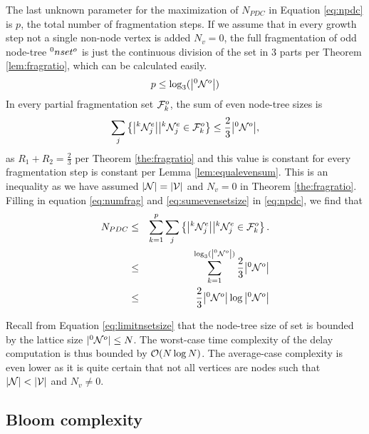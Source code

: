 

The last unknown parameter for the maximization of $N_{PDC}$ in Equation \eqref{eq:npdc} is $p$, the total number of fragmentation steps. If we assume that in every growth step not a single non-node vertex is added $N_v = 0$, the full fragmentation of odd node-tree ${}^{0}nset^o$ is just the continuous division of the set in 3 parts per Theorem \ref{lem:fragratio}, which can be calculated easily.
\begin{equation}\label{eq:numfrag}
  p \leq \log_3(\abs{{}^{0}\mathcal{N}^o})
\end{equation}
In every partial fragmentation set $\mathcal{F}^o_k$, the sum of even node-tree sizes is 
\begin{equation}\label{eq:sumevensetsize}
  \sum_j \left\{ \abs{{}^{k}\mathcal{N}_j^e} \big| {}^{k}\mathcal{N}_j^e \in \mathcal{F}^o_k \right\} \leq \frac{2}{3}\abs{{}^{0}\mathcal{N}^o},
\end{equation}
as $R_1+R_2 = \frac{2}{3}$ per Theorem \ref{the:fragratio} and this value is constant for every fragmentation step is constant per Lemma \ref{lem:equalevensum}. This is an inequality as we have assumed $|\mathcal{N}| = |\mathcal{V}|$ and $N_v=0$ in Theorem \ref{the:fragratio}. Filling in equation \eqref{eq:numfrag} and \eqref{eq:sumevensetsize} in \eqref{eq:npdc}, we find that
\begin{eqnarray}
\nonumber  N_{PDC}  &\leq& \sum_{k=1}^{p} \sum_j \left\{ \abs{{}^{k}\mathcal{N}_j^e} \big| {}^{k}\mathcal{N}_j^e \in \mathcal{F}^o_k \right\}. \\
\nonumber           &\leq& \sum_{k=1}^{\log_3(\abs{{}^{0}\mathcal{N}^o})} \frac{2}{3}\abs{{}^{0}\mathcal{N}^o} \\
                    &\leq& \frac{2}{3}\abs{{}^{0}\mathcal{N}^o}\log{\abs{ {}^{0} \mathcal{N}^o}}
\end{eqnarray}

Recall from Equation \eqref{eq:limitnsetsize} that the node-tree size of set is bounded by the lattice size $|{}^{0}\mathcal{N}^o| \leq N$. The worst-case time complexity of the delay computation is thus bounded by $\mathcal{O}(N\log{N})$. The average-case complexity is even lower as it is quite certain that not all vertices are nodes such that $|\mathcal{N}| < |\mathcal{V}|$ and $N_v \neq 0$.

\subsection{Bloom complexity}\label{sec:bloomcomplexity}

